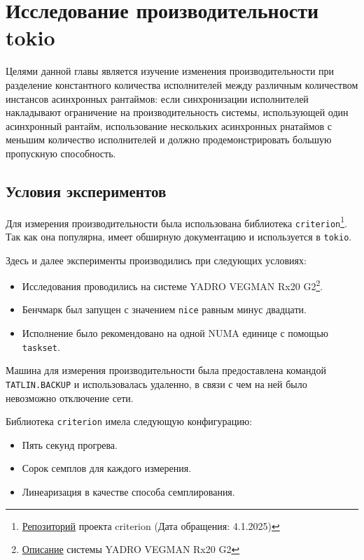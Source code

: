 
\section{Исследование производительности tokio}

Целями данной главы является изучение изменения производительности при разделение константного количества исполнителей между различным количеством инстансов асинхронных рантаймов: если синхронизации исполнителей накладывают ограничение на производительность системы, использующей один асинхронный рантайм, использование нескольких асинхронных рнатаймов с меньшим количество исполнителей и должно продемонстрировать большую пропускную способность.

\subsection{Условия экспериментов}

Для измерения производительности была использована библиотека \verb|criterion|\footnote{\href{https://github.com/bheisler/criterion.rs}{Репозиторий} проекта criterion (Дата обращения: 4.1.2025)}. Так как она популярна, имеет обширную документацию и используется в \verb|tokio|.

Здесь и далее эксперименты производились при следующих условиях:

\begin{itemize}
    \item Исследования проводились на системе YADRO VEGMAN Rx20 G2\footnote{\href{https://yadro.com/ru/vegman/rx20g2/specs}{Описание} системы YADRO VEGMAN Rx20 G2}.
    \item Бенчмарк был запущен с значением \verb|nice| равным минус двадцати.
    \item Исполнение было рекомендовано на одной NUMA единице с помощью \verb|taskset|.
\end{itemize}

Машина для измерения производительности была предоставлена командой \verb|TATLIN.BACKUP| и использовалась удаленно, в связи с чем на ней было невозможно отключение сети.

Библиотека \verb|criterion| имела следующую конфигурацию:

\begin{itemize}
    \item Пять секунд прогрева.
    \item Сорок семплов для каждого измерения.
    \item Линеаризация в качестве способа семплирования.
\end{itemize}

